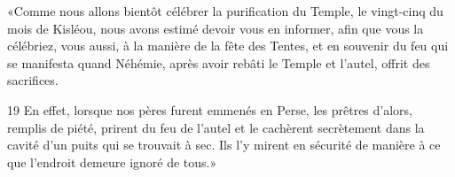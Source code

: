 «Comme nous allons bientôt célébrer la purification du Temple, le vingt-cinq du mois de Kisléou, nous avons estimé devoir vous en informer, afin que vous la célébriez, vous aussi, à la manière de la fête des Tentes, et en souvenir du feu qui se manifesta quand Néhémie, après avoir rebâti le Temple et l’autel, offrit des sacrifices.

19 En effet, lorsque nos pères furent emmenés en Perse, les prêtres d’alors, remplis de piété, prirent du feu de l’autel et le cachèrent secrètement dans la cavité d’un puits qui se trouvait à sec. Ils l’y mirent en sécurité de manière à ce que l’endroit demeure ignoré de tous.»